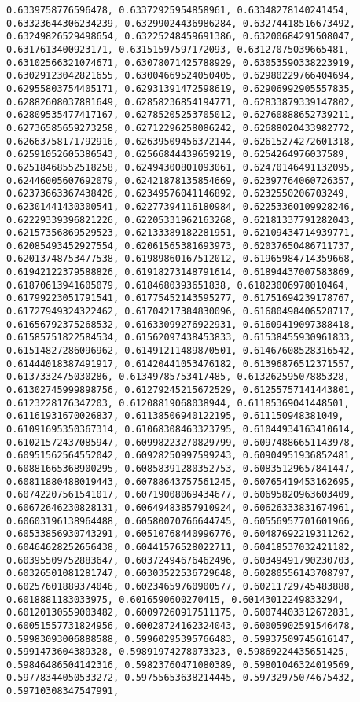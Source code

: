 \documentclass[11pt]{article}
\begin{document}
\begin{Verbatim}[commandchars=\\\{\}]
0.6339758776596478, 0.63372925954858961, 0.63348278140241454, 0.63323644306234239, 0.63299024436986284, 0.63274418516673492, 0.63249826529498654, 0.63225248459691386, 0.63200684291508047, 0.6317613400923171, 0.63151597597172093, 0.63127075039665481, 0.63102566321074671, 0.63078071425788929, 0.63053590338223919, 0.63029123042821655, 0.63004669524050405, 0.62980229766404694, 0.62955803754405171, 0.62931391472598619, 0.62906992905557835, 0.62882608037881649, 0.62858236854194771, 0.62833879339147802, 0.62809535477417167, 0.62785205253705012, 0.62760888652739211, 0.62736585659273258, 0.62712296258086242, 0.62688020433982772, 0.62663758171792916, 0.62639509456372144, 0.62615274272601318, 0.62591052605386543, 0.62566844439659219, 0.6254264976037589, 0.62518468552518258, 0.62494300801093061, 0.62470146491132095, 0.62446005607692079, 0.62421878135854669, 0.62397764060726357, 0.62373663367438426, 0.62349576041146892, 0.6232550206703249, 0.62301441430300541, 0.62277394116180984, 0.62253360109928246, 0.62229339396821226, 0.62205331962163268, 0.62181337791282043, 0.62157356869529523, 0.62133389182281951, 0.62109434714939771, 0.62085493452927554, 0.62061565381693973, 0.62037650486711737, 0.62013748753477538, 0.61989860167512012, 0.61965984714359668, 0.61942122379588826, 0.61918273148791614, 0.61894437007583869, 0.61870613941605079, 0.6184680393651838, 0.61823006978010464, 0.61799223051791541, 0.61775452143595277, 0.61751694239178767, 0.61727949324322462, 0.61704217384830096, 0.61680498406528717, 0.61656792375268532, 0.61633099276922931, 0.61609419097388418, 0.61585751822584534, 0.61562097438453833, 0.61538455930961833, 0.61514827286096962, 0.61491211489870501, 0.61467608528316542, 0.61444018387491917, 0.61420441053476182, 0.61396876512371557, 0.6137332475030286, 0.61349785753417485, 0.61326259507885328, 0.61302745999898756, 0.61279245215672529, 0.61255757141443801, 0.6123228176347203, 0.61208819068038944, 0.61185369041448501, 0.61161931670026837, 0.61138506940122195, 0.611150948381049, 0.61091695350367314, 0.61068308463323795, 0.61044934163410614, 0.61021572437085947, 0.60998223270829799, 0.60974886651143978, 0.60951562564552042, 0.60928250997599243, 0.60904951936852481, 0.60881665368900295, 0.60858391280352753, 0.60835129657841447, 0.60811880488019443, 0.60788643757561245, 0.60765419453162695, 0.60742207561541017, 0.60719008069434677, 0.60695820963603409, 0.60672646230828131, 0.60649483857910924, 0.60626333831674961, 0.60603196138964488, 0.60580070766644745, 0.60556957701601966, 0.60533856930743291, 0.60510768440996776, 0.60487692219311262, 0.60464628252656438, 0.60441576528022711, 0.60418537032421182, 0.60395509752883647, 0.60372494676462496, 0.60349491790230703, 0.60326501081281747, 0.60303522536729648, 0.60280556143708797, 0.60257601889374046, 0.60234659760900577, 0.60211729745483888, 0.6018881183033975, 0.6016590600270415, 0.60143012249833294, 0.60120130559003482, 0.60097260917511175, 0.60074403312672831, 0.60051557731824956, 0.60028724162324043, 0.60005902591546478, 0.59983093006888588, 0.59960295395766483, 0.59937509745616147, 0.5991473604389328, 0.59891974278073323, 0.59869224435651425, 0.59846486504142316, 0.59823760471080389, 0.59801046324019569, 0.59778344050533272, 0.59755653638214445, 0.59732975074675432, 0.59710308347547991, 
\end{Verbatim}
\end{document}
